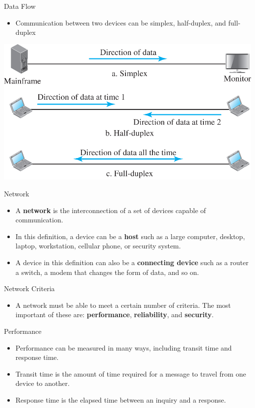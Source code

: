 \documentclass[pdflatex,compress]{beamer}
\begin{document}
\begin{frame}{Data Flow}
	\begin{itemize}
		\item Communication between two devices can be simplex, half-duplex, and full-duplex
	\end{itemize}
	\begin{center}
		\includegraphics[width=0.9\linewidth]{img/02}
	\end{center}
\end{frame}

\begin{frame}{Network}
	\begin{itemize}
		\item A \textbf{network} is the interconnection of a set of devices capable of communication.
		\item In this definition, a device can be a \textbf{host} such as a large computer, desktop, laptop, workstation, cellular phone, or security system.
		\item A device in this definition can also be a \textbf{connecting device} such as a router a switch, a modem that changes the form of data, and so on.
	\end{itemize}
\end{frame}

\begin{frame}{Network Criteria}
	\begin{itemize}
		\item A network must be able to meet a certain number of criteria. The most important of these are: \textbf{performance}, \textbf{reliability}, and \textbf{security}.
	\end{itemize}
\end{frame}

\begin{frame}{Performance}
	\begin{itemize}
		\item Performance can be measured in many ways, including transit time and response time.
		\item Transit time is the amount of time required for a message to travel from one device to another.
		\item Response time is the elapsed time between an inquiry and a response.
	\end{itemize}
\end{frame}
\end{document}
